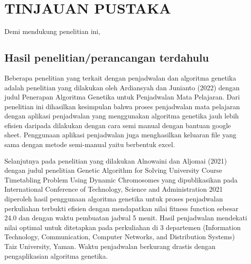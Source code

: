 \chapter{TINJAUAN PUSTAKA}
\label{chap:tinjauanpustaka}


Demi mendukung penelitian ini, \lipsum[1][1-5]

\section{Hasil penelitian/perancangan terdahulu }
\label{sec:roketluarangkasa}




Beberapa penelitian yang terkait dengan penjadwalan dan algoritma genetika adalah 
\linebreak penelitian yang dilakukan oleh Ardiansyah dan Junianto (2022) 
dengan judul Penerapan \linebreak Algoritma Genetika untuk Penjadwalan Mata Pelajaran. 
Dari penelitian ini dihasilkan kesimpulan bahwa proses penjadwalan mata pelajaran dengan 
aplikasi penjadwalan yang menggunakan algoritma genetika jauh lebih efisien daripada 
dilakukan dengan cara semi manual dengan bantuan google sheet. Penggunaan aplikasi 
penjadwalan juga menghasilkan keluaran file yang sama dengan metode semi-manual yaitu berbentuk excel.

Selanjutnya pada penelitian yang dilakukan Alnowaini dan Aljomai (2021) dengan judul penelitian 
Genetic Algorithm for Solving University Course Timetabling Problem Using Dynamic Chromosomes 
yang dipublikasikan pada International Conference of Technology, Science and Administration 2021 
diperoleh hasil penggunaan algoritma genetika untuk proses penjadwalan perkuliahan terbukti efisien 
dengan mendapatkan nilai fitness function sebesar 24.0 dan dengan waktu pembuatan jadwal 5 menit. 
Hasil penjadwalan mendekati nilai optimal untuk ditetapkan pada perkuliahan di 3 departemen 
(Information Technology, Communication, Computer Networks, and Distribution Systems) Taiz University, Yaman. 
Waktu penjadwalan berkurang drastis dengan pengaplikasian algoritma genetika.

